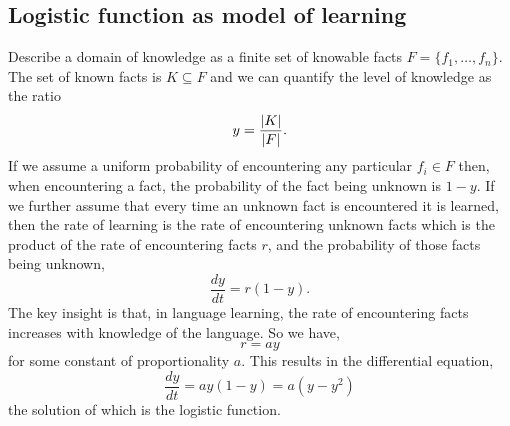 \documentclass[MathsNotesBase.tex]{subfiles}
\date{\vspace{-6ex}}
\begin{document}
	\subsection{Logistic function as model of learning}
	\bigskip
	Describe a domain of knowledge as a finite set of knowable facts ${ F = \{f_1,\dots,f_n\} }$. The set of known facts is ${ K \subseteq F }$ and we can quantify the level of knowledge as the ratio
	\[ y = \frac{\left\lvert K\right\rvert}{\left\lvert F\right\rvert}. \]
	If we assume a uniform probability of encountering any particular ${ f_i \in F }$ then, when encountering a fact, the probability of the fact being unknown is ${ 1 - y }$. If we further assume that every time an unknown fact is encountered it is learned, then the rate of learning is the rate of encountering unknown facts which is the product of the rate of encountering facts $r$, and the probability of those facts being unknown,
	\[ \frac{dy}{dt} = r(1 - y). \]
	The key insight is that, in language learning, the rate of encountering facts increases with knowledge of the language. So we have,
	\[ r = ay \]
	for some constant of proportionality $a$. This results in the differential equation,
	\[ \frac{dy}{dt} = ay(1 - y) = a(y - y^2) \]
	the solution of which is the logistic function.
\end{document}
